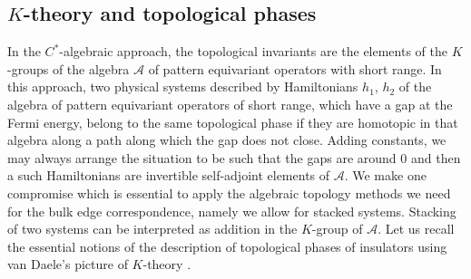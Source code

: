 \documentclass[11pt]{amsart}
\begin{document}
\subsection{$K$-theory and topological phases}\label{sec-K-theory}
In the $C^*$-algebraic approach, the topological invariants are the elements of the $K$-groups of the algebra $\mathcal A$ of pattern equivariant operators with short range. In this approach, two physical systems described by Hamiltonians $h_1$, $h_2$ of the algebra of pattern equivariant operators of short range, which have a gap at the Fermi energy, belong to the same topological phase if they are homotopic in that algebra along a path along which the gap does not close. Adding constants, we may always arrange the situation to be such that the gaps are around $0$ and then a such Hamiltonians are invertible self-adjoint elements of $\mathcal A$. We make one compromise which is essential to apply the algebraic topology methods we need for the bulk edge correspondence, namely we allow for stacked systems. Stacking of two systems can be interpreted as addition in the $K$-group of $\mathcal A$. Let us recall the essential notions of the description of topological phases of insulators using van Daele's picture of $K$-theory \cite{kellendonk2017c}.
\end{document}
